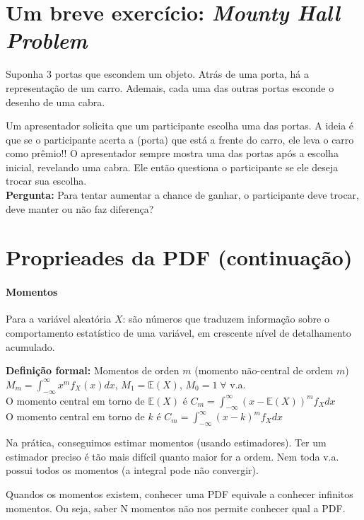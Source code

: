 \documentclass{article}
\renewcommand\bf[1]{\textbf{#1}}
\renewcommand\it[1]{\textit{#1}}
\begin{document}
\setlength{\abovedisplayskip}{12pt}
\setlength{\belowdisplayskip}{12pt}
\setlength{\abovedisplayshortskip}{0pt}
\setlength{\belowdisplayshortskip}{0pt}
\setlength{\jot}{0pt}

\section{Um breve exercício: \it{Mounty Hall Problem}}
Suponha 3 portas que escondem um objeto. Atrás de uma porta, há a representação de um carro.
Ademais, cada uma das outras portas esconde o desenho de uma cabra.

Um apresentador solicita que um participante escolha uma das portas. A ideia é que se o
participante acerta a (porta) que está a frente do carro, ele leva o carro como prêmio!! O
apresentador sempre mostra uma das portas após a escolha inicial, revelando uma cabra. Ele então
questiona o participante se ele deseja trocar sua escolha.
\\
\bf{Pergunta:} Para tentar aumentar a chance de ganhar, o participante deve trocar, deve manter ou
não faz diferença?

\section{Proprieades da PDF (continuação)}
\paragraph{Momentos}
Para a variável aleatória $X$: são números que traduzem informação sobre o comportamento
estatístico de uma variável, em crescente nível de detalhamento acumulado.

\bf{Definição formal:} Momentos de orden $m$ (momento não-central de ordem $m$) $M_m =
\int^\infty_{-\infty}
x^mf_X(x)dx$, $M_1 = \mathbb{E}(X)$, $M_0 = 1 \; \forall $ v.a.
\\[0.25em]
O momento central em torno de $\mathbb{E}(X)$ é $C_m = \int^\infty_{-\infty} (x-\mathbb{E}(X))^m f_Xdx$
\\
O momento central em torno de $k$ é $C_m = \int^\infty_{-\infty} (x-k)^m f_Xdx$

Na prática, conseguimos estimar momentos (usando estimadores). Ter um estimador preciso é tão mais
difícil quanto maior for a ordem. Nem toda v.a. possui todos os momentos (a integral pode não
convergir).

Quandos os momentos existem, conhecer uma PDF equivale a conhecer infinitos momentos. Ou seja,
saber N momentos não nos permite conhecer qual a PDF.
\end{document}
